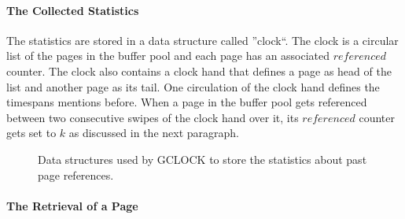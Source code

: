 \paragraph{The Collected Statistics}

	The statistics are stored in a data structure called ''clock``. The clock is a circular list of the pages in the buffer pool and each page has an associated $referenced$ counter. The clock also contains a clock hand that defines a page as head of the list and another page as its tail. One circulation of the clock hand defines the timespans mentions before. When a page in the buffer pool gets referenced between two consecutive swipes of the clock hand over it, its $referenced$ counter gets set to $k$ as discussed in the next paragraph.

\begin{@empty}

	\begin{figure}[ht!]
		\centering
		\caption{Data structures used by GCLOCK to store the statistics about past page references.}
		\label{fig:datastructuresgclock}
	\end{figure}
\end{@empty}

\paragraph{The Retrieval of a Page}


